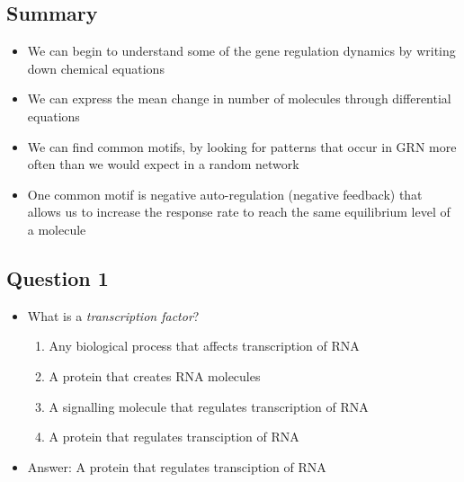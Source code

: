 \begin{slide}
\section{Summary}

\begin{PauseHighLight}
  \begin{itemize}
  \item We can begin to understand some of the gene regulation dynamics
    by writing down chemical equations\pause
  \item We can express the mean change in number of molecules through
    differential equations\pause
  \item We can find common motifs, by looking for patterns that occur in
    GRN more often than we would expect in a random network\pause
  \item One common motif is negative auto-regulation (negative feedback)
    that allows us to increase the response rate to reach the same
    equilibrium level of a molecule\pause
  \end{itemize}
\end{PauseHighLight}

\end{slide}

\Outline %

\begin{slide}
\section{Question 1}

\begin{PauseHighLight}
  \begin{itemize}
  \item What is a \emph{transcription factor}?
    \begin{enumerate}\setlength\itemsep{0.5em}
    \item Any biological process that affects transcription of RNA
    \item A protein that creates RNA molecules
    \item A signalling molecule that regulates transcription of RNA
    \item A protein that regulates transciption of RNA\pause
    \end{enumerate}
  \item Answer: A protein that regulates transciption of RNA\pauseb
  \end{itemize}
\end{PauseHighLight}

\end{slide}

